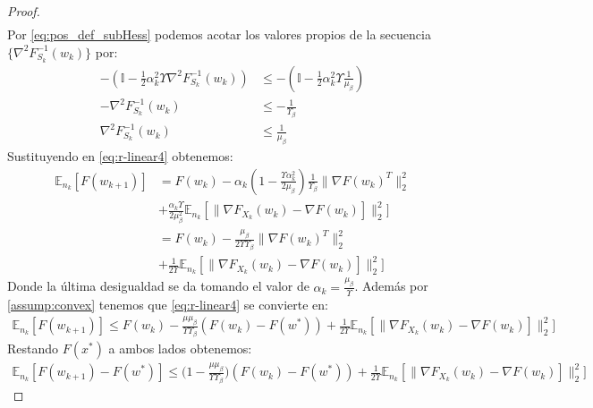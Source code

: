 \documentclass{book}
\theoremstyle{plain}
\theoremstyle{definition}
\theoremstyle{remark}
\begin{document}
\begin{proof}
\begin{equation}
\begin{split}
\end{split}
\end{equation}
Por \ref{eq:pos_def_subHess} podemos acotar los valores propios de la secuencia $\{\nabla^2F_{S_k}^{-1}(w_k)\}$ por: 
\begin{equation*}
\begin{split}
    -(\mathbb{I}-\frac{1}{2}\alpha^2_k\Upsilon\nabla^2F_{S_k}^{-1}(w_k)) & \leq -(\mathbb{I}-\frac{1}{2}\alpha^2_k\Upsilon\frac{1}{\mu_\beta}) \\
    - \nabla^2F_{S_k}^{-1}(w_k) & \leq -\frac{1}{\Upsilon_\beta}\\
      \nabla^2F_{S_k}^{-1}(w_k) & \leq \frac{1}{\mu_\beta}
\end{split}
\end{equation*}
Sustituyendo en \ref{eq:r-linear4} obtenemos: 
\begin{equation}
\begin{split}
     \mathbb{E}_{n_k}[F(w_{k+1})] & =F(w_{k}) -\alpha_k(1-\frac{\Upsilon\alpha^2_k}{2\mu_\beta})\frac{1}{\Upsilon_\beta}\|\nabla F(w_{k})^T\|_2^2\\ & + \frac{\alpha_k\Upsilon}{2\mu_\beta^2}\mathbb{E}_{n_k}[\|\nabla F_{X_k}(w_k) - \nabla F(w_k)]\|_2^2]\\
     & =F(w_{k}) -\frac{\mu_\beta}{2\Upsilon\Upsilon_\beta}\|\nabla F(w_{k})^T\|_2^2\\ & + \frac{1}{2\Upsilon}\mathbb{E}_{n_k}[\|\nabla F_{X_k}(w_k) - \nabla F(w_k)]\|_2^2]
\end{split}
\end{equation}
Donde la última desigualdad se da tomando el valor de $\alpha_k = \frac{\mu_\beta}{\Upsilon}$. Además por  \ref{assump:convex} tenemos que  \ref{eq:r-linear4} se convierte en: 
\begin{equation*}
    \begin{split}
        \mathbb{E}_{n_k}[F(w_{k+1})] \leq F(w_{k}) -\frac{\mu\mu_\beta}{\Upsilon\Upsilon_\beta}(F(w_k) - F(w^*))+ \frac{1}{2\Upsilon}\mathbb{E}_{n_k}[\|\nabla F_{X_k}(w_k) - \nabla F(w_k)]\|_2^2]
    \end{split}
\end{equation*}
Restando $F(x^*)$ a ambos lados obtenemos:
\begin{equation}\label{eq:r-linear5} 
    \begin{split}
        \mathbb{E}_{n_k}[F(w_{k+1})- F(w^*)] \leq\bigg(1 -\frac{\mu\mu_\beta}{\Upsilon\Upsilon_\beta}\bigg)(F(w_k) - F(w^*))+ \frac{1}{2\Upsilon}\mathbb{E}_{n_k}[\|\nabla F_{X_k}(w_k) - \nabla F(w_k)]\|_2^2]
    \end{split}

\end{equation}
\end{proof}
\end{document}
